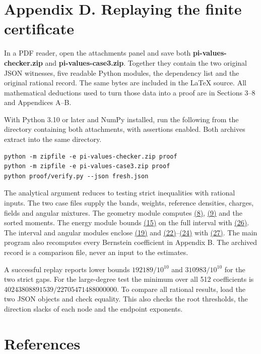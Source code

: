 \documentclass[11pt,a4paper]{article}
\begin{document}
\section{Appendix D. Replaying the finite certificate}\label{appendix-d.-replaying-the-finite-certificate}

In a PDF reader, open the attachments panel and save both \textbf{pi-values-checker.zip} and \textbf{pi-values-case3.zip}. Together they contain the two original JSON witnesses, five readable Python modules, the dependency list and the original rational record. The same bytes are included in the LaTeX source. All mathematical deductions used to turn those data into a proof are in Sections 3--8 and Appendices A--B.

With Python 3.10 or later and NumPy installed, run the following from the directory containing both attachments, with assertions enabled. Both archives extract into the same directory.

\begin{verbatim}
python -m zipfile -e pi-values-checker.zip proof
python -m zipfile -e pi-values-case3.zip proof
python proof/verify.py --json fresh.json
\end{verbatim}

The analytical argument reduces to testing strict inequalities with rational inputs. The two case files supply the bands, weights, reference densities, charges, fields and angular mixtures. The geometry module computes \hyperref[eq:8]{(8)}, \hyperref[eq:9]{(9)} and the sorted moments. The energy module bounds \hyperref[eq:15]{(15)} on the full interval with \hyperref[eq:26]{(26)}. The interval and angular modules enclose \hyperref[eq:19]{(19)} and \hyperref[eq:22]{(22)}--\hyperref[eq:24]{(24)} with \hyperref[eq:27]{(27)}. The main program also recomputes every Bernstein coefficient in Appendix B. The archived record is a comparison file, never an input to the estimates.

A successful replay reports lower bounds \(192189/10^{10}\) and \(310983/10^{10}\) for the two strict gaps. For the large-degree test the minimum over all 512 coefficients is \(40243808891539/22705471488000000\). To compare all rational results, load the two JSON objects and check equality. This also checks the root thresholds, the direction slacks of each node and the endpoint exponents.

\section{References}\label{references}
\end{document}
